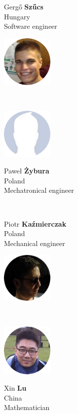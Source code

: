 \documentclass[a4paper, 11pt, article]{report}
\begin{document}
\begin{minipage}{0.4\textwidth}\center
Gergő \textbf{Szűcs} \\   
Hungary \\
Software engineer
\end{minipage}%
\hfill%
\begin{minipage}{0.4\textwidth}\raggedright
\includegraphics[width=2.5cm]{images/gergo}
\end{minipage} \\[1.5cm]

\begin{minipage}{0.3\textwidth}\raggedleft
\includegraphics[width=2.5cm]{images/pawel}
\end{minipage}
\hfill
\begin{minipage}{0.7\textwidth}\center
Paweł \textbf{Żybura} \\   
Poland \\
Mechatronical engineer
\end{minipage} \\[1.5cm]

\begin{minipage}{0.4\textwidth}\center
Piotr \textbf{Kaźmierczak} \\  
Poland \\
Mechanical engineer
\end{minipage}%
\hfill%
\begin{minipage}{0.4\textwidth}\raggedright
\includegraphics[width=2.5cm]{images/piotr}
\end{minipage} \\[1.5cm]

\begin{minipage}{0.3\textwidth}\raggedleft
\includegraphics[width=2.5cm]{images/xin}
\end{minipage}
\hfill
\begin{minipage}{0.7\textwidth}\center
Xin \textbf{Lu} \\   
China \\
Mathematician
\end{minipage}
\end{document}
